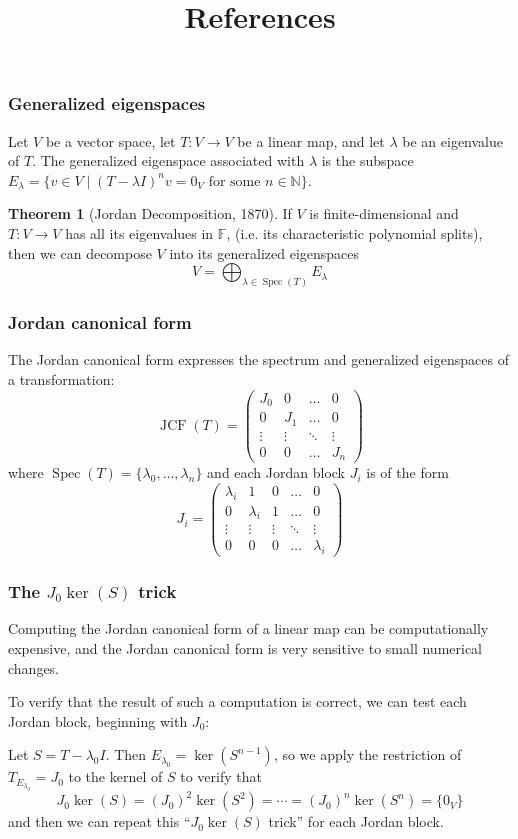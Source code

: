 \documentclass{beamer}
\newcommand{\N}{\mathbb{N}}
\DeclareMathOperator{\Spec}{Spec}
\theoremstyle{definition}
\newtheorem*{theorem*}{Theorem}
\begin{document}
\begin{frame}
    \frametitle{Generalized eigenspaces}

    \begin{definition}
        Let $V$ be a vector space, let $T: V \longrightarrow V$ be a linear map, and let $\lambda$ be an eigenvalue of $T$.
        The generalized eigenspace associated with $\lambda$ is the subspace $E_\lambda = \{v \in V \mid (T - \lambda I)^n v = 0_V \text{ for some } n \in \N\}$.
    \end{definition}
    \begin{theorem*}[Jordan Decomposition, 1870]
        If $V$ is finite-dimensional and $T: V \longrightarrow V$ has all its eigenvalues in $\mathbb{F}$, (i.e. its characteristic polynomial splits), then
        we can decompose $V$ into its generalized eigenspaces
        \[
            V = \bigoplus_{\lambda \in \Spec(T)} E_\lambda  
        \]
    \end{theorem*}
\end{frame}

\begin{frame}
    \frametitle{Jordan canonical form}
    The Jordan canonical form expresses the spectrum and generalized eigenspaces of a transformation:
    \[
        \operatorname{JCF}(T) = \begin{pmatrix}
            J_0 & 0 & \ldots & 0 \\
            0 & J_1 & \ldots & 0 \\
            \vdots & \vdots & \ddots & \vdots \\
            0 & 0 & \ldots & J_n
        \end{pmatrix}
    \]
    where $\Spec(T) = \{\lambda_0, \ldots, \lambda_n\}$ and each Jordan block $J_i$ is of the form
    \[
        J_i = \begin{pmatrix}
            \lambda_i & 1 & 0 & \ldots & 0 \\
            0 & \lambda_i & 1 & \ldots & 0 \\
            \vdots & \vdots & \vdots & \ddots & \vdots \\
            0 & 0 & 0 & \ldots & \lambda_i
        \end{pmatrix}
    \]
\end{frame}

\begin{frame}
    \frametitle{The $J_0 \ker(S)$ trick}
    
    Computing the Jordan canonical form of a linear map can be computationally expensive, and the Jordan canonical form is very sensitive
    to small numerical changes.

    \pause
    To verify that the result of such a computation is correct, we can test each Jordan block, beginning with $J_0$:

    \pause
    Let $S = T - \lambda_0 I$. Then $E_{\lambda_0} = \ker(S^{n-1})$, so we apply the restriction of $T_{E_{\lambda_0}} = J_0$ to the kernel of $S$
    to verify that
    \[
        J_0 \ker(S) = (J_0)^2 \ker(S^2) = \cdots = (J_0)^n \ker(S^n) = \{0_V\}
    \]
    and then we can repeat this ``$J_0 \ker(S)$ trick'' for each Jordan block.
\end{frame}

\begin{frame}
    \title{References}
    \printbibliography
\end{frame}
\end{document}
